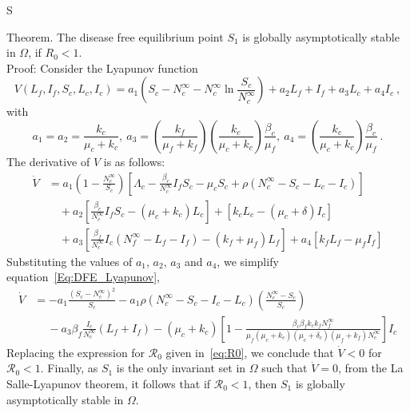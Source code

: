 S\documentclass[preprint,12pt]{elsarticle}
\begin{document}
\noindent Theorem. The disease free equilibrium point $S_1$ is globally asymptotically stable in $\Omega$, if $R_0<1$.\\
Proof: Consider the Lyapunov function
$$V(L_f,I_f,S_c,L_c,I_c) = a_1\left(S_c - N_{c}^{\infty} - N_{c}^{\infty}\ln{\frac{S_c}{N_{c}^{\infty}}}\right) + a_2 L_f + I_f + a_3 L_c + a_4 I_c~,$$
with
$$
a_1 = a_2 = \frac{k_c}{\mu_c + k_c},\ a_3 = \left(\frac{k_f}{\mu_f + k_f}\right)\left(\frac{k_c}{\mu_c + k_c}\right)\frac{\beta_c}{\mu_f},\ a_4 = \left(\frac{k_c}{\mu_c + k_c}\right)\frac{\beta_c}{\mu_f}~.
$$
The derivative of $V$ is as follows:
\begin{equation}\label{Eq:DFE_Lyapunov}
    \begin{aligned}
    \dot{V} &= a_1\left(1 - \frac{N_{c}^{\infty}}{S_c}\right)\left[\Lambda_c-\frac{\beta_c}{N_c^{\infty}}I_fS_c-\mu_cS_c+\rho \left(N_c^{\infty} - S_c - L_c - I_c\right)\right]\\
    &\quad + a_2 \left[\frac{\beta_c}{N_c^{\infty}}I_fS_c-\left(\mu_c+k_c\right)L_c\right] + \left[k_c L_c-\left(\mu_c +\delta\right)I_c\right]\\
    &\quad + a_3\left[\frac{\beta_f}{N_c^{\infty}}I_c\left(N_f^{\infty} - L_f - I_f\right)-\left(k_f+\mu_f\right)L_f\right] + a_4 \left[k_f L_f-\mu_f I_f \right]
    \end{aligned}
\end{equation}
Substituting the values of $a_1$, $a_2$, $a_3$ and $a_4$, we simplify equation~\ref{Eq:DFE_Lyapunov},
\begin{equation*}
    \begin{aligned}
    \dot{V} &= -a_1\frac{\left(S_c - N_{c}^{\infty}\right)^{2}}{S_c} - a_1\rho\left(N_{c}^{\infty} - S_c - I_c - L_c\right)\left(\frac{N_{c}^{\infty} - S_c}{S_c}\right)\\
    &\quad\ - a_3\beta_f\frac{I_c}{N_{c}^{\infty}}\left(L_f + I_f\right) - \left(\mu_c + k_c\right)\left[1 - \frac{\beta_c\beta_f k_c k_fN_f^{\infty}}{\mu_f(\mu_c+k_c)(\mu_c+\delta_c)(\mu_f+k_f)N_c^{\infty}}\right]I_c
    \end{aligned}
\end{equation*}
Replacing the expression for $\mathcal{R}_{0}$ given in~\eqref{eq:R0}, we conclude that $\dot{V} < 0$ for $\mathcal{R}_{0} < 1$. Finally, as $S_{1}$ is the only invariant set in $\Omega$ such that $\dot{V}=0$, from the La Salle-Lyapunov theorem, it follows that if $\mathcal{R}_{0} < 1$, then $S_{1}$ is globally asymptotically stable in $\Omega$.
\end{document}
